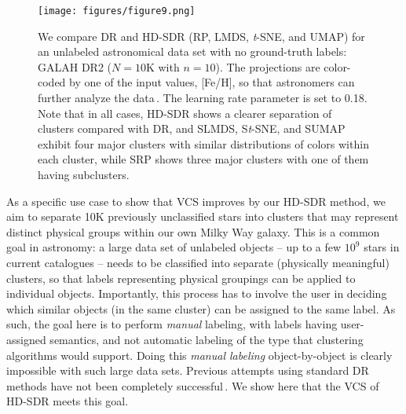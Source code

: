 \documentclass[sagev,Afour,times]{sagej}
\begin{document}
\begin{figure*}[htb]
  \centering
  \texttt{[image: figures/figure9.png]}
  \parbox[t]{1\columnwidth}{\relax}
  \caption{\label{fig:9astro_fdr} We compare DR and HD-SDR (RP, LMDS, \emph{t}-SNE, and UMAP) for an unlabeled astronomical data set with no ground-truth labels: GALAH DR2 ($N=10\mathrm{K}$ with $n=10$). The projections are color-coded by one of the input values, [Fe/H], so that astronomers can further analyze the data\,\cite{tsne:astro}. The learning rate parameter is set to 0.18. Note that in all cases, HD-SDR shows a clearer separation of clusters compared with DR, and SLMDS, S\emph{t}-SNE, and SUMAP exhibit four major clusters with similar distributions of colors within each cluster, while SRP shows three major clusters with one of them having subclusters.}
\end{figure*}

As a specific use case to show that VCS improves by our HD-SDR method, we aim to separate 10K previously unclassified stars into clusters that may represent distinct physical groups within our own Milky Way galaxy. This is a common goal in astronomy: a large data set of unlabeled objects -- up to a few $10^9$ stars in current catalogues -- needs to be classified into separate (physically meaningful) clusters, so that labels representing physical groupings can be applied to individual objects. Importantly, this process has to involve the user in deciding which similar objects (in the same cluster) can be assigned to the same label. As such, the goal here is to perform \emph{manual} labeling, with labels having user-assigned semantics, and not automatic labeling of the type that clustering algorithms would support. Doing this \emph{manual labeling} object-by-object is clearly impossible with such large data sets. Previous attempts using standard DR methods have not been completely successful\,\cite{tsne:astro}. We show here that the VCS of HD-SDR meets this goal.
\end{document}
